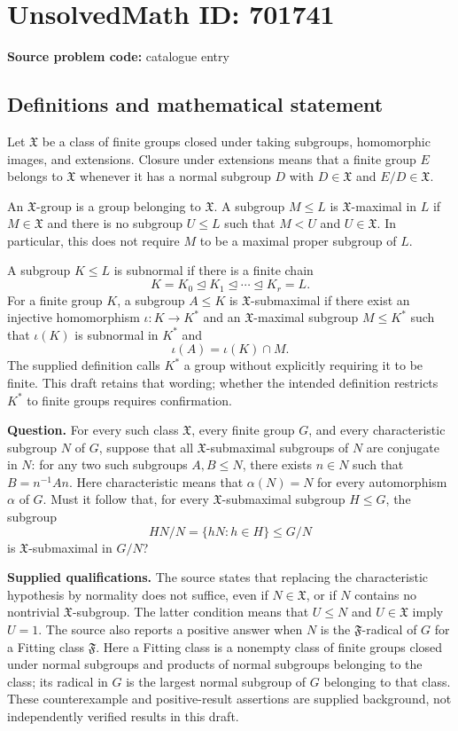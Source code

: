 \documentclass[11pt]{article}
\begin{document}
\section*{UnsolvedMath ID: 701741}
\textbf{Source problem code:} catalogue entry
\subsection{Definitions and mathematical statement}
Let \(\mathfrak{X}\) be a class of finite groups closed under taking subgroups, homomorphic images, and extensions. Closure under extensions means that a finite group \(E\) belongs to \(\mathfrak{X}\) whenever it has a normal subgroup \(D\) with \(D\in\mathfrak{X}\) and \(E/D\in\mathfrak{X}\).

An \(\mathfrak{X}\)-group is a group belonging to \(\mathfrak{X}\). A subgroup \(M\leq L\) is \(\mathfrak{X}\)-maximal in \(L\) if \(M\in\mathfrak{X}\) and there is no subgroup \(U\leq L\) such that \(M<U\) and \(U\in\mathfrak{X}\). In particular, this does not require \(M\) to be a maximal proper subgroup of \(L\).

A subgroup \(K\leq L\) is subnormal if there is a finite chain
\[
K=K_0\trianglelefteq K_1\trianglelefteq\cdots\trianglelefteq K_r=L.
\]
For a finite group \(K\), a subgroup \(A\leq K\) is \(\mathfrak{X}\)-submaximal if there exist an injective homomorphism \(\iota:K\to K^*\) and an \(\mathfrak{X}\)-maximal subgroup \(M\leq K^*\) such that \(\iota(K)\) is subnormal in \(K^*\) and
\[
\iota(A)=\iota(K)\cap M.
\]
The supplied definition calls \(K^*\) a group without explicitly requiring it to be finite. This draft retains that wording; whether the intended definition restricts \(K^*\) to finite groups requires confirmation.

\textbf{Question.} For every such class \(\mathfrak{X}\), every finite group \(G\), and every characteristic subgroup \(N\) of \(G\), suppose that all \(\mathfrak{X}\)-submaximal subgroups of \(N\) are conjugate in \(N\): for any two such subgroups \(A,B\leq N\), there exists \(n\in N\) such that \(B=n^{-1}An\). Here characteristic means that \(\alpha(N)=N\) for every automorphism \(\alpha\) of \(G\). Must it follow that, for every \(\mathfrak{X}\)-submaximal subgroup \(H\leq G\), the subgroup
\[
HN/N=\{hN:h\in H\}\leq G/N
\]
is \(\mathfrak{X}\)-submaximal in \(G/N\)?

\textbf{Supplied qualifications.} The source states that replacing the characteristic hypothesis by normality does not suffice, even if \(N\in\mathfrak{X}\), or if \(N\) contains no nontrivial \(\mathfrak{X}\)-subgroup. The latter condition means that \(U\leq N\) and \(U\in\mathfrak{X}\) imply \(U=1\). The source also reports a positive answer when \(N\) is the \(\mathfrak{F}\)-radical of \(G\) for a Fitting class \(\mathfrak{F}\). Here a Fitting class is a nonempty class of finite groups closed under normal subgroups and products of normal subgroups belonging to the class; its radical in \(G\) is the largest normal subgroup of \(G\) belonging to that class. These counterexample and positive-result assertions are supplied background, not independently verified results in this draft.
\end{document}
